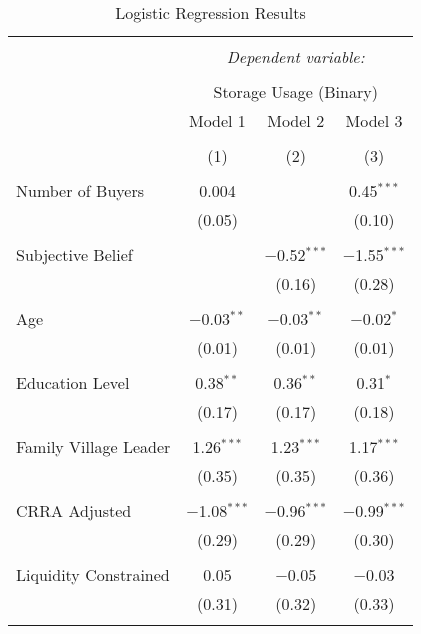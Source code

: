 
\begin{table}[H] \centering 
  \caption{Logistic Regression Results} 
  \label{tab: binary storage ~ buyers' competition at harvest} 
\footnotesize 
\begin{tabular}{@{\extracolsep{5pt}}lccc} 
\\[-1.8ex]\hline 
\hline \\[-1.8ex] 
 & \multicolumn{3}{c}{\textit{Dependent variable:}} \\ 
\cline{2-4} 
\\[-1.8ex] & \multicolumn{3}{c}{Storage Usage (Binary)} \\ 
 & Model 1 & Model 2 & Model 3 \\ 
\\[-1.8ex] & (1) & (2) & (3)\\ 
\hline \\[-1.8ex] 
 Number of Buyers & 0.004 &  & 0.45$^{***}$ \\ 
  & (0.05) &  & (0.10) \\ 
  & & & \\ 
 Subjective Belief &  & $-$0.52$^{***}$ & $-$1.55$^{***}$ \\ 
  &  & (0.16) & (0.28) \\ 
  & & & \\ 
 Age & $-$0.03$^{**}$ & $-$0.03$^{**}$ & $-$0.02$^{*}$ \\ 
  & (0.01) & (0.01) & (0.01) \\ 
  & & & \\ 
 Education Level & 0.38$^{**}$ & 0.36$^{**}$ & 0.31$^{*}$ \\ 
  & (0.17) & (0.17) & (0.18) \\ 
  & & & \\ 
 Family Village Leader & 1.26$^{***}$ & 1.23$^{***}$ & 1.17$^{***}$ \\ 
  & (0.35) & (0.35) & (0.36) \\ 
  & & & \\ 
 CRRA Adjusted & $-$1.08$^{***}$ & $-$0.96$^{***}$ & $-$0.99$^{***}$ \\ 
  & (0.29) & (0.29) & (0.30) \\ 
  & & & \\ 
 Liquidity Constrained & 0.05 & $-$0.05 & $-$0.03 \\ 
  & (0.31) & (0.32) & (0.33) \\ 
  & & & \\ 

\end{tabular}
\end{table}
